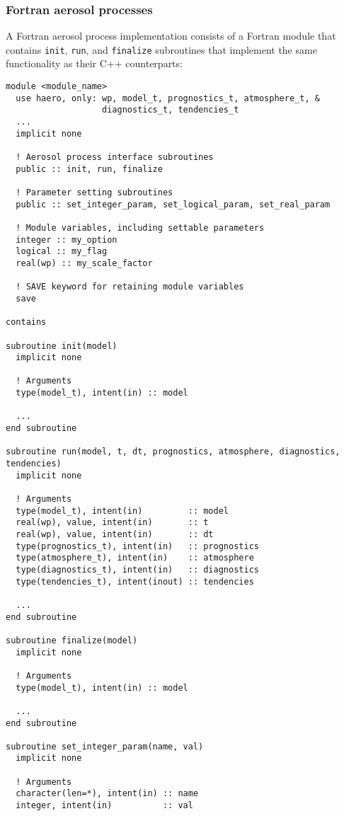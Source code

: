 \subsubsection{Fortran aerosol processes}

A Fortran aerosol process implementation consists of a Fortran module that
contains \texttt{init}, \texttt{run}, and \texttt{finalize} subroutines that
implement the same functionality as their C++ counterparts:

\begin{lstlisting}
module <module_name>
  use haero, only: wp, model_t, prognostics_t, atmosphere_t, &
                   diagnostics_t, tendencies_t
  ...
  implicit none

  ! Aerosol process interface subroutines
  public :: init, run, finalize

  ! Parameter setting subroutines
  public :: set_integer_param, set_logical_param, set_real_param

  ! Module variables, including settable parameters
  integer :: my_option
  logical :: my_flag
  real(wp) :: my_scale_factor

  ! SAVE keyword for retaining module variables
  save

contains

subroutine init(model)
  implicit none

  ! Arguments
  type(model_t), intent(in) :: model

  ...
end subroutine

subroutine run(model, t, dt, prognostics, atmosphere, diagnostics, tendencies)
  implicit none

  ! Arguments
  type(model_t), intent(in)         :: model
  real(wp), value, intent(in)       :: t
  real(wp), value, intent(in)       :: dt
  type(prognostics_t), intent(in)   :: prognostics
  type(atmosphere_t), intent(in)    :: atmosphere
  type(diagnostics_t), intent(in)   :: diagnostics
  type(tendencies_t), intent(inout) :: tendencies

  ...
end subroutine

subroutine finalize(model)
  implicit none

  ! Arguments
  type(model_t), intent(in) :: model

  ...
end subroutine

subroutine set_integer_param(name, val)
  implicit none

  ! Arguments
  character(len=*), intent(in) :: name
  integer, intent(in)          :: val


\end{lstlisting}
